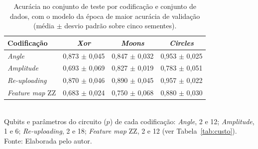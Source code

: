 \begin{table}[htb]
\centering
\caption[Acurácia de teste por codificação e conjunto de dados]{Acurácia no conjunto de teste por codificação e conjunto de dados, com o modelo da época de maior acurácia de validação (média $\pm$ desvio padrão sobre cinco sementes).}
\label{tab:acuracia}
\begin{tabular}{lccc}
\toprule
Codificação & \textit{Xor} & \textit{Moons} & \textit{Circles} \\
\midrule
\textit{Angle} & 0,873 $\pm$ 0,045 & 0,847 $\pm$ 0,032 & 0,953 $\pm$ 0,025 \\
\textit{Amplitude} & 0,693 $\pm$ 0,069 & 0,827 $\pm$ 0,019 & 0,783 $\pm$ 0,051 \\
\textit{Re-uploading} & 0,870 $\pm$ 0,046 & 0,890 $\pm$ 0,045 & 0,957 $\pm$ 0,022 \\
\textit{Feature map} ZZ & 0,683 $\pm$ 0,024 & 0,750 $\pm$ 0,068 & 0,880 $\pm$ 0,030 \\
\bottomrule
\end{tabular}
\\[2pt]
{\footnotesize Qubits e parâmetros do circuito ($p$) de cada codificação: \textit{Angle}, 2 e 12; \textit{Amplitude}, 1 e 6; \textit{Re-uploading}, 2 e 18; \textit{Feature map} ZZ, 2 e 12 (ver Tabela~\ref{tab:custo}).}
\\[2pt]
{\footnotesize Fonte: Elaborada pelo autor.}
\end{table}
